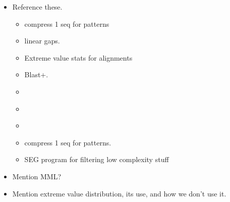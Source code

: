 \documentclass[letterpaper,11pt,oneside]{article}
\begin{document}
\begin{itemize}

\item Reference these.
\begin{itemize}
\item compress 1 seq for patterns \cite{allison00a}

\item linear gaps. \cite{altschul86}

\item Extreme value stats for alignments \cite{karlin90}

\item Blast+. \cite{altschul97}

\item \cite{grumbach94}

\item \cite{loewenstern97}

\item \cite{rivals97}

\item compress 1 seq for patterns. \cite{stern01}

\item SEG program for filtering low complexity stuff \cite{wootton93}
\end{itemize}


\item Mention MML?

\item Mention extreme value distribution, its use, and how we don't use it.

\end{itemize}
\end{document}
